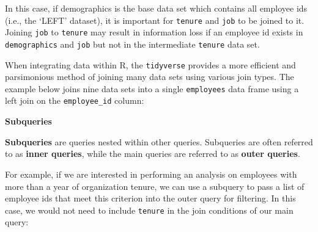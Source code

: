 \documentclass[]{book}
\newenvironment{Shaded}{\begin{snugshade}}{\end{snugshade}}
\newcommand{\CommentTok}[1]{\textcolor[rgb]{0.56,0.35,0.01}{\textit{#1}}}
\newcommand{\DataTypeTok}[1]{\textcolor[rgb]{0.13,0.29,0.53}{#1}}
\newcommand{\KeywordTok}[1]{\textcolor[rgb]{0.13,0.29,0.53}{\textbf{#1}}}
\newcommand{\NormalTok}[1]{#1}
\newcommand{\OperatorTok}[1]{\textcolor[rgb]{0.81,0.36,0.00}{\textbf{#1}}}
\newcommand{\StringTok}[1]{\textcolor[rgb]{0.31,0.60,0.02}{#1}}
\begin{document}
In this case, if demographics is the base data set which contains all employee ids (i.e., the `LEFT' dataset), it is important for \texttt{tenure} and \texttt{job} to be joined to it. Joining \texttt{job} to \texttt{tenure} may result in information loss if an employee id exists in \texttt{demographics} and \texttt{job} but not in the intermediate \texttt{tenure} data set.

When integrating data within R, the \texttt{tidyverse} provides a more efficient and parsimonious method of joining many data sets using various join types. The example below joins nine data sets into a single \texttt{employees} data frame using a left join on the \texttt{employee\_id} column:

\begin{Shaded}
\end{Shaded}

\textbf{Subqueries}

\textbf{Subqueries} are queries nested within other queries. Subqueries are often referred to as \textbf{inner queries}, while the main queries are referred to as \textbf{outer queries}.

For example, if we are interested in performing an analysis on employees with more than a year of organization tenure, we can use a subquery to pass a list of employee ids that meet this criterion into the outer query for filtering. In this case, we would not need to include \texttt{tenure} in the join conditions of our main query:
\end{document}
